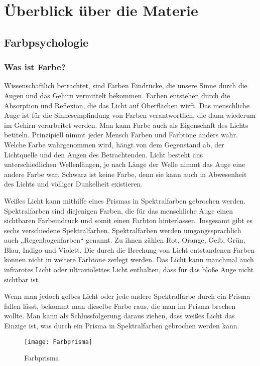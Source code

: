 \chapter{Überblick über die Materie}

\section{Farbpsychologie}

\subsection{Was ist Farbe?}
Wissenschaftlich betrachtet, sind Farben Eindrücke, die unsere Sinne durch die Augen und das Gehirn vermittelt bekommen. Farben entstehen durch die Absorption und Reflexion, die das Licht auf Oberflächen wirft. Das menschliche Auge ist für die Sinnesempfindung von Farben verantwortlich, die dann wiederum im Gehirn verarbeitet werden. Man kann Farbe auch als Eigenschaft des Lichts betiteln. Prinzipiell nimmt jeder Mensch Farben und Farbtöne anders wahr. Welche Farbe wahrgenommen wird, hängt von dem Gegenstand ab, der Lichtquelle und den Augen des Betrachtenden. Licht besteht aus unterschiedlichen Wellenlängen, je nach Länge der Welle nimmt das Auge eine andere Farbe war. Schwarz ist keine Farbe, denn sie kann auch in Abwesenheit des Lichts und völliger Dunkelheit existieren.

Weißes Licht kann mithilfe eines Prismas in Spektralfarben gebrochen werden. Spektralfarben sind diejenigen Farben, die für das menschliche Auge einen sichtbaren Farbeindruck und somit einen Farbton hinterlassen. Insgesamt gibt es sechs verschiedene Spektralfarben. Spektralfarben werden umgangssprachlich auch „Regenbogenfarben“ genannt. Zu ihnen zählen Rot, Orange, Gelb, Grün, Blau, Indigo und Violett. Die durch die Brechung von Licht entstandenen Farben können nicht in weitere Farbtöne zerlegt werden. Das Licht kann manchmal auch infrarotes Licht oder ultraviolettes Licht enthalten, dass für das bloße Auge nicht sichtbar ist.

Wenn man jedoch gelbes Licht oder jede andere Spektralfarbe durch ein Prisma fallen lässt, bekommt man dieselbe Farbe raus, die man im Prisma brechen wollte. Man kann als Schlussfolgerung daraus ziehen, dass weißes Licht das Einzige ist, was durch ein Prisma in Spektralfarben gebrochen werden kann.
\cite{_special_subjects}
\cite{_leifi_physik}

\begin{figure}[H]
	\centering
	\texttt{[image: Farbprisma]}
	\caption{Farbprisma\cite{_basicColorTheory}}
\end{figure}

